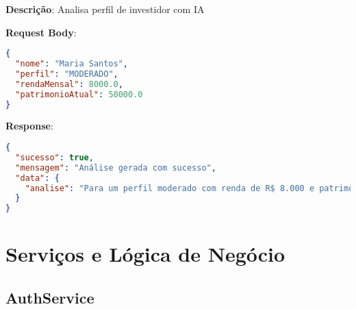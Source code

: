 \documentclass[12pt,a4paper]{article}
\begin{document}
\textbf{Descrição}: Analisa perfil de investidor com IA

\textbf{Request Body}:
\begin{lstlisting}[language=json]
{
  "nome": "Maria Santos",
  "perfil": "MODERADO",
  "rendaMensal": 8000.0,
  "patrimonioAtual": 50000.0
}
\end{lstlisting}

\textbf{Response}:
\begin{lstlisting}[language=json]
{
  "sucesso": true,
  "mensagem": "Análise gerada com sucesso",
  "data": {
    "analise": "Para um perfil moderado com renda de R$ 8.000 e patrimônio de R$ 50.000, recomendo uma diversificação equilibrada..."
  }
}
\end{lstlisting}

\section{Serviços e Lógica de Negócio}

\subsection{AuthService}
\end{document}
